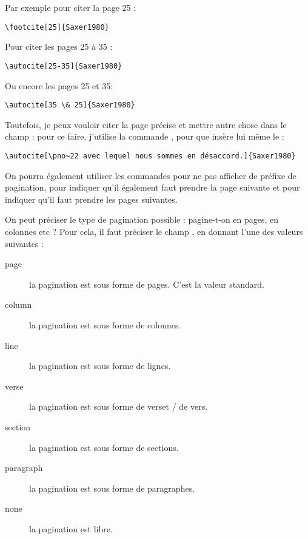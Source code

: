 Par exemple pour citer la page 25 : 
\begin{verbatim}
\footcite[25]{Saxer1980}
\end{verbatim}

 Pour citer les pages 25 à 35 :

\begin{verbatim}
\autocite[25-35]{Saxer1980}
\end{verbatim}

Ou encore les pages 25 et 35:

\begin{verbatim}
\autocite[35 \& 25]{Saxer1980}
\end{verbatim}

Toutefois, je peux vouloir citer la page précise et mettre autre chose dans le champ  : pour ce faire, j'utilise la commande , pour que  insère lui même le  :

\begin{verbatim}
\autocite[\pno~22 avec lequel nous sommes en désaccord.]{Saxer1980}
\end{verbatim}

\begin{quotation}
	\parencite[\pno~22 avec lequel nous sommes en désaccord.]{Saxer1980}
\end{quotation}

On pourra également utiliser les commandes  pour ne pas afficher de préfixe de pagination,   pour indiquer qu'il également faut prendre la page suivante et  pour indiquer qu'il faut prendre les pages suivantes.

On peut préciser le type de pagination possible : pagine-t-on en pages, en colonnes etc ? Pour cela, il faut préciser le champ , en donnant l'une des valeurs suivantes : 

\begin{description}
\item[page]la pagination est sous forme de pages. C'est la valeur standard.
\item[column]la pagination est sous forme de colonnes.
\item[line]la pagination est sous forme de lignes.
\item[verse]la pagination est sous forme de verset / de vers. 
\item[section]la pagination est sous forme de sections.
\item[paragraph]la pagination est sous forme de paragraphes.
\item[none]la pagination est libre.
\end{description}



